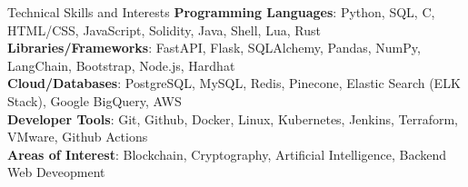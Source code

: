 \documentclass{resume} %
\begin{document}

\begin{rSection}{Technical Skills and Interests}
	\textbf{Programming Languages}{: Python, SQL, C, HTML/CSS, JavaScript, Solidity, Java, Shell, Lua, Rust} \\
	\textbf{Libraries/Frameworks}{: FastAPI, Flask, SQLAlchemy, Pandas, NumPy, LangChain, Bootstrap, Node.js, Hardhat} \\
	\textbf{Cloud/Databases}{: PostgreSQL, MySQL, Redis, Pinecone, Elastic Search (ELK Stack), Google BigQuery, AWS} \\
	\textbf{Developer Tools}{: Git, Github, Docker, Linux, Kubernetes, Jenkins, Terraform, VMware, Github Actions} \\
	\textbf{Areas of Interest}{: Blockchain, Cryptography, Artificial Intelligence, Backend Web Deveopment}
\end{rSection}
\end{document}
